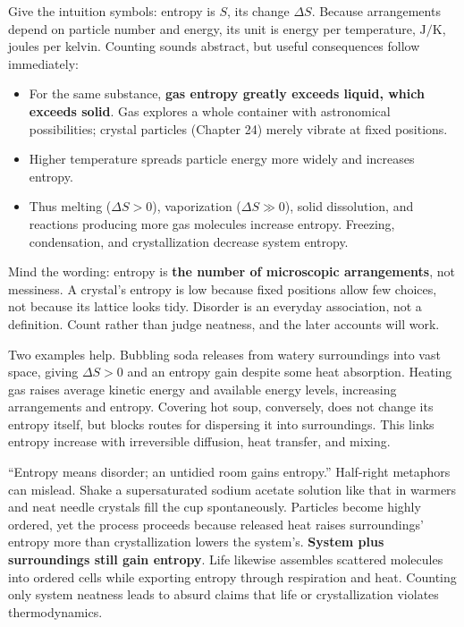 Give the intuition symbols: entropy is $S$, its change $\Delta S$. Because arrangements depend on particle number and energy, its unit is energy per temperature, $\mathrm{J/K}$, joules per kelvin. Counting sounds abstract, but useful consequences follow immediately:

\begin{itemize}[itemsep=2pt]
\item For the same substance, \textbf{gas entropy greatly exceeds liquid, which exceeds solid}. Gas explores a whole container with astronomical possibilities; crystal particles (Chapter 24) merely vibrate at fixed positions.
\item Higher temperature spreads particle energy more widely and increases entropy.
\item Thus melting ($\Delta S>0$), vaporization ($\Delta S\gg 0$), solid dissolution, and reactions producing more gas molecules increase entropy. Freezing, condensation, and crystallization decrease system entropy.
\end{itemize}

Mind the wording: entropy is \textbf{the number of microscopic arrangements}, not messiness. A crystal's entropy is low because fixed positions allow few choices, not because its lattice looks tidy. Disorder is an everyday association, not a definition. Count rather than judge neatness, and the later accounts will work.

Two examples help. Bubbling soda releases  from watery surroundings into vast space, giving $\Delta S>0$ and an entropy gain despite some heat absorption. Heating gas raises average kinetic energy and available energy levels, increasing arrangements and entropy. Covering hot soup, conversely, does not change its entropy itself, but blocks routes for dispersing it into surroundings. This links entropy increase with irreversible diffusion, heat transfer, and mixing.

\begin{wuqu}
``Entropy means disorder; an untidied room gains entropy.'' Half-right metaphors can mislead. Shake a supersaturated sodium acetate solution like that in warmers and neat needle crystals fill the cup spontaneously. Particles become highly ordered, yet the process proceeds because released heat raises surroundings' entropy more than crystallization lowers the system's. \textbf{System plus surroundings still gain entropy}. Life likewise assembles scattered molecules into ordered cells while exporting entropy through respiration and heat. Counting only system neatness leads to absurd claims that life or crystallization violates thermodynamics.
\end{wuqu}

